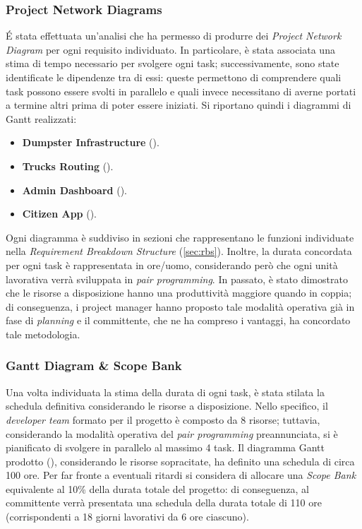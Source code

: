 \subsubsection{Project Network Diagrams}
\'E stata effettuata un'analisi che ha permesso di produrre dei \textit{Project Network Diagram} per ogni requisito individuato. In particolare, è stata associata una stima di tempo necessario per svolgere ogni task; successivamente, sono state identificate le dipendenze tra di essi: queste permettono di comprendere quali task possono essere svolti in parallelo e quali invece necessitano di averne portati a termine altri prima di poter essere iniziati. Si riportano quindi i diagrammi di Gantt realizzati:
\begin{itemize}
    \item \textbf{Dumpster Infrastructure} ().
    \item \textbf{Trucks Routing} ().
    \item \textbf{Admin Dashboard} ().
    \item \textbf{Citizen App} ().
\end{itemize}
Ogni diagramma è suddiviso in sezioni che rappresentano le funzioni individuate nella \textit{Requirement Breakdown Structure} (\ref{sec:rbs}). Inoltre, la durata concordata per ogni task è rappresentata in ore/uomo, considerando però che ogni unità lavorativa verrà sviluppata in \textit{pair programming}.
In passato, è stato dimostrato che le risorse a disposizione hanno una produttività maggiore quando in coppia; di conseguenza, i project manager hanno proposto tale modalità operativa già in fase di \textit{planning} e il committente, che ne ha compreso i vantaggi, ha concordato tale metodologia.

\subsubsection{Gantt Diagram \& Scope Bank}
Una volta individuata la stima della durata di ogni task, è stata stilata la schedula definitiva considerando le risorse a disposizione. Nello specifico, il \textit{developer team} formato per il progetto è composto da 8 risorse; tuttavia, considerando la modalità operativa del \textit{pair programming} preannunciata, si è pianificato di svolgere in parallelo al massimo 4 task. Il diagramma Gantt prodotto (), considerando le risorse sopracitate, ha definito una schedula di circa 100 ore. Per far fronte a eventuali ritardi si considera di allocare una \textit{Scope Bank} equivalente al 10\% della durata totale del progetto: di conseguenza, al committente verrà presentata una schedula della durata totale di 110 ore (corrispondenti a 18 giorni lavorativi da 6 ore ciascuno).
